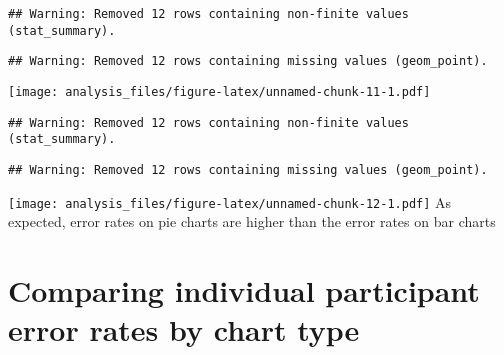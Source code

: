 \documentclass[]{article}
\newenvironment{Shaded}{\begin{snugshade}}{\end{snugshade}}
\newcommand{\KeywordTok}[1]{\textcolor[rgb]{0.13,0.29,0.53}{\textbf{{#1}}}}
\newcommand{\DataTypeTok}[1]{\textcolor[rgb]{0.13,0.29,0.53}{{#1}}}
\newcommand{\FloatTok}[1]{\textcolor[rgb]{0.00,0.00,0.81}{{#1}}}
\newcommand{\StringTok}[1]{\textcolor[rgb]{0.31,0.60,0.02}{{#1}}}
\newcommand{\NormalTok}[1]{{#1}}
\begin{document}
\begin{verbatim}
## Warning: Removed 12 rows containing non-finite values (stat_summary).
\end{verbatim}

\begin{verbatim}
## Warning: Removed 12 rows containing missing values (geom_point).
\end{verbatim}

\texttt{[image: analysis\_files/figure-latex/unnamed-chunk-11-1.pdf]}

\begin{Shaded}
\end{Shaded}

\begin{verbatim}
## Warning: Removed 12 rows containing non-finite values (stat_summary).
\end{verbatim}

\begin{verbatim}
## Warning: Removed 12 rows containing missing values (geom_point).
\end{verbatim}

\texttt{[image: analysis\_files/figure-latex/unnamed-chunk-12-1.pdf]} As
expected, error rates on pie charts are higher than the error rates on
bar charts

\section{Comparing individual participant error rates by chart
type}\label{comparing-individual-participant-error-rates-by-chart-type}
\end{document}
